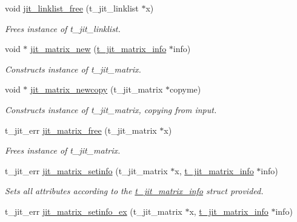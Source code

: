 \begin{DoxyCompactItemize}
\item 
void \hyperlink{group__matrixmod_ga42ada5c64ab9ba19ba4e58461dd1a823}{jit\_\-linklist\_\-free} (t\_\-jit\_\-linklist $\ast$x)
\begin{DoxyCompactList}\small\item\em Frees instance of t\_\-jit\_\-linklist. \item\end{DoxyCompactList}\item 
void $\ast$ \hyperlink{group__matrixmod_gac7c617a1e6cb1cbf2a5a8cdc27697eff}{jit\_\-matrix\_\-new} (\hyperlink{structt__jit__matrix__info}{t\_\-jit\_\-matrix\_\-info} $\ast$info)
\begin{DoxyCompactList}\small\item\em Constructs instance of t\_\-jit\_\-matrix. \item\end{DoxyCompactList}\item 
void $\ast$ \hyperlink{group__matrixmod_ga900b5d226f56a36d2285e64e7d501eb7}{jit\_\-matrix\_\-newcopy} (t\_\-jit\_\-matrix $\ast$copyme)
\begin{DoxyCompactList}\small\item\em Constructs instance of t\_\-jit\_\-matrix, copying from input. \item\end{DoxyCompactList}\item 
t\_\-jit\_\-err \hyperlink{group__matrixmod_gafcd9da344bd48c0e38b36d2d70451125}{jit\_\-matrix\_\-free} (t\_\-jit\_\-matrix $\ast$x)
\begin{DoxyCompactList}\small\item\em Frees instance of t\_\-jit\_\-matrix. \item\end{DoxyCompactList}\item 
t\_\-jit\_\-err \hyperlink{group__matrixmod_ga2324cd46df9bcd18c84d6bd49bf1b091}{jit\_\-matrix\_\-setinfo} (t\_\-jit\_\-matrix $\ast$x, \hyperlink{structt__jit__matrix__info}{t\_\-jit\_\-matrix\_\-info} $\ast$info)
\begin{DoxyCompactList}\small\item\em Sets all attributes according to the \hyperlink{structt__jit__matrix__info}{t\_\-jit\_\-matrix\_\-info} struct provided. \item\end{DoxyCompactList}\item 
t\_\-jit\_\-err \hyperlink{group__matrixmod_ga626c0457e1ade74e808c1afcfd22a9c2}{jit\_\-matrix\_\-setinfo\_\-ex} (t\_\-jit\_\-matrix $\ast$x, \hyperlink{structt__jit__matrix__info}{t\_\-jit\_\-matrix\_\-info} $\ast$info)

\end{DoxyCompactItemize}
